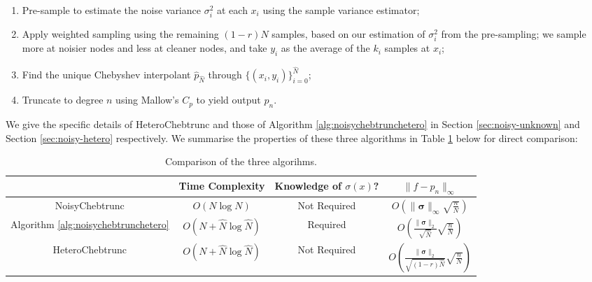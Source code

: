 \documentclass[pdflatex,sn-mathphys-num]{sn-jnl}%
\theoremstyle{thmstyleone}%
\theoremstyle{thmstyletwo}%
\theoremstyle{thmstylethree}%
\begin{document}
\begin{enumerate}
	\item Pre-sample to estimate the noise variance $\sigma_i^2$ at each $x_i$ using the sample variance estimator;
	\item Apply weighted sampling using the remaining $(1-r)N$ samples, based on our estimation of $\sigma_i^2$ from the pre-sampling; we sample more at noisier nodes and less at cleaner nodes, and take $y_i$ as the average of the $k_i$ samples at $x_i$;
	\item Find the unique Chebyshev interpolant $\hat{p}_{\hat{N}}$ through $\{(x_i, y_i)\}_{i=0}^{\hat{N}}$;
	\item Truncate to degree $n$ using Mallow's $C_p$ to yield output $p_n$.
\end{enumerate}

We give the specific details of HeteroChebtrunc and those of Algorithm \ref{alg:noisychebtrunchetero} in Section \ref{sec:noisy-unknown} and Section \ref{sec:noisy-hetero} respectively. We summarise the properties of these three algorithms in Table \ref{tab:compare} below for direct comparison:

\begin{table}[h!]
	\caption{Comparison of the three algorihms.}
	\label{tab:compare}
        \centering
	\begin{tabular}{|c|c|c|c|}
			\hline
			& Time Complexity & Knowledge of $\sigma(x)$? & $\|f-p_n\|_\infty$ \\
			\hline
			NoisyChebtrunc & $O(N\log N)$ & Not Required & $O(\|\bm{\sigma}\|_\infty\sqrt{\frac{n}{N}})$  \\
			
			Algorithm \ref{alg:noisychebtrunchetero} & $O(N+\hat{N}\log \hat{N})$ & Required & $O(\frac{\|\bm{\sigma}\|_2}{\sqrt{\hat{N}}}\sqrt{\frac{n}{N}})$ \\
			
			HeteroChebtrunc & $O(N+\hat{N}\log \hat{N})$ & Not Required & $O(\frac{\|\bm{\sigma}\|_2}{\sqrt{(1-r)\hat{N}}}\sqrt{\frac{n}{N}})$ \\
			\hline
	\end{tabular}
\end{table}
\end{document}
